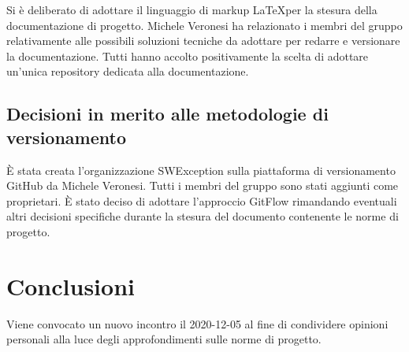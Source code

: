 Si è deliberato di adottare il linguaggio di markup \LaTeX per la stesura della documentazione di progetto. Michele Veronesi ha relazionato i membri del gruppo relativamente alle possibili soluzioni tecniche da adottare per redarre e versionare la documentazione. Tutti hanno accolto positivamente la scelta di adottare un'unica repository dedicata alla documentazione.

\subsection{Decisioni in merito alle metodologie di versionamento}
È stata creata l'organizzazione SWException sulla piattaforma di versionamento GitHub da Michele Veronesi. Tutti i membri del gruppo sono stati aggiunti come proprietari. È stato deciso di adottare l'approccio GitFlow rimandando eventuali altri decisioni specifiche durante la stesura del documento contenente le norme di progetto.


\section{Conclusioni}
Viene convocato un nuovo incontro il 2020-12-05 al fine di condividere opinioni personali alla luce degli approfondimenti sulle norme di progetto.
